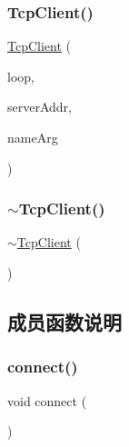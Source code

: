 \subsubsection{\texorpdfstring{Tcp\+Client()}{TcpClient()}}
{\footnotesize\ttfamily \hyperlink{classmuduo_1_1net_1_1TcpClient}{Tcp\+Client} (\begin{DoxyParamCaption}\item[{\hyperlink{classmuduo_1_1net_1_1EventLoop}{Event\+Loop} $\ast$}]{loop,  }\item[{const \hyperlink{classmuduo_1_1net_1_1InetAddress}{Inet\+Address} \&}]{server\+Addr,  }\item[{const string \&}]{name\+Arg }\end{DoxyParamCaption})}

\mbox{\label{classmuduo_1_1net_1_1TcpClient_a01845d2886f327b9c8cb5df03cb00d7c}} 
\subsubsection{\texorpdfstring{$\sim$\+Tcp\+Client()}{~TcpClient()}}
{\footnotesize\ttfamily $\sim$\hyperlink{classmuduo_1_1net_1_1TcpClient}{Tcp\+Client} (\begin{DoxyParamCaption}{ }\end{DoxyParamCaption})}



\subsection{成员函数说明}
\mbox{\label{classmuduo_1_1net_1_1TcpClient_a1396bf9b5defe9fa844a63b5cd40ac0e}} 
\subsubsection{\texorpdfstring{connect()}{connect()}}
{\footnotesize\ttfamily void connect (\begin{DoxyParamCaption}{ }\end{DoxyParamCaption})}

